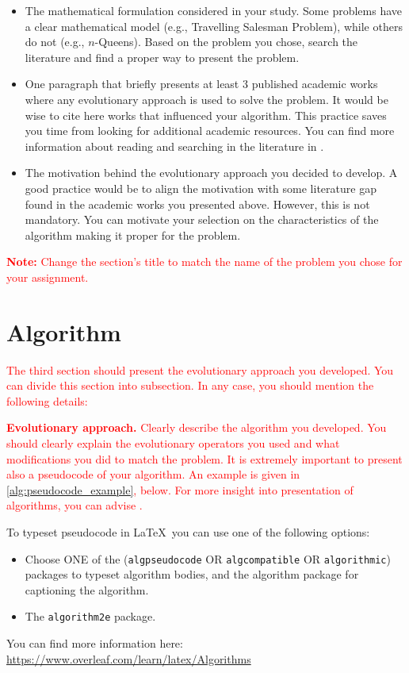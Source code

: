 \documentclass{scrartcl}
\begin{document}
{\color{red}
\begin{itemize}
    \item The mathematical formulation considered in your study. Some problems have a clear mathematical model (e.g., Travelling Salesman Problem), while others do not (e.g., $n$-Queens). Based on the problem you chose, search the literature and find a proper way to present the problem.
    \item One paragraph that briefly presents at least 3 published academic works where any evolutionary approach is used to solve the problem. It would be wise to cite here works that influenced your algorithm. This practice saves you time from looking for additional academic resources. You can find more information about reading and searching in the literature in \cite{zobel2014reading}.
    \item The motivation behind the evolutionary approach you decided to develop. A good practice would be to align the motivation with some literature gap found in the academic works you presented above. However, this is not mandatory. You can motivate your selection on the characteristics of the algorithm making it proper for the problem.
\end{itemize}
}

\textcolor{red}{\textbf{Note:} Change the section's title to match the name of the problem you chose for your assignment.}

\lipsum[2]


\section{Algorithm}
\label{sec:algorithm}

\textcolor{red}{The third section should present the evolutionary approach you developed. You can divide this section into subsection. In any case, you should mention the following details:}

\textcolor{red}{\textbf{Evolutionary approach.} Clearly describe the algorithm you developed. You should clearly explain the evolutionary operators you used and what modifications you did to match the problem. It is extremely important to present also a pseudocode of your algorithm. An example is given in \ref{alg:pseudocode_example}, below. For more insight into presentation of algorithms, you can advise \cite{zobel2014algorithms}.}

{
\color{red}To typeset pseudocode in \LaTeX\ you can use one of the following options:
\begin{itemize}
    \item Choose ONE of the (\texttt{algpseudocode} OR \texttt{algcompatible} OR \texttt{algorithmic}) packages to typeset algorithm bodies, and the algorithm package for captioning the algorithm.
    \item The \texttt{algorithm2e} package.
\end{itemize}
You can find more information here: \url{https://www.overleaf.com/learn/latex/Algorithms}
}
\end{document}
